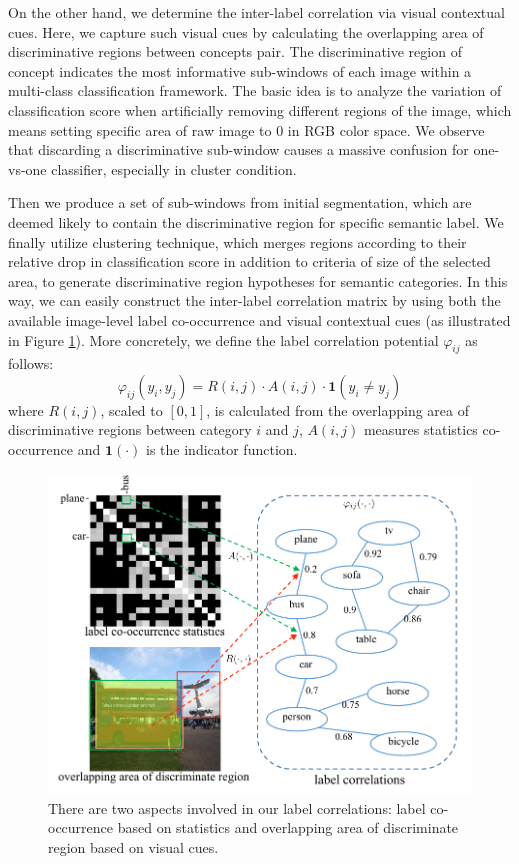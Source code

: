 On the other hand, we determine the inter-label correlation via visual contextual cues. Here, we capture such visual cues by calculating the overlapping area of discriminative regions between concepts pair. The discriminative region of concept indicates the most informative sub-windows of each image within a multi-class classification framework.
The basic idea is to analyze the variation of classification score when artificially removing different regions of the image, which means setting specific area of raw image to 0 in RGB color space. We observe that discarding a discriminative sub-window causes a massive confusion for one-vs-one classifier, especially in cluster condition.

Then we produce a set of sub-windows from initial segmentation, which are deemed likely to contain the discriminative region for specific semantic label. We finally utilize clustering technique, which merges regions according to their relative drop in classification score in addition to criteria of size of the selected area, to generate discriminative region hypotheses for semantic categories. In this way, we can easily construct the inter-label correlation matrix by using both the available image-level label co-occurrence and visual contextual cues (as illustrated in Figure \ref{fig:correlations}).
More concretely, we define the label correlation potential $\varphi_{ij}$ as follows:
\begin{equation}
    \varphi_{ij}(y_i,y_j) = R(i,j) \cdot A(i,j) \cdot \mathbf{1}(y_i \neq y_j)
\end{equation}
where $R(i,j)$, scaled to $[0,1]$, is calculated from the overlapping area of discriminative regions between category $i$ and $j$, $A(i,j)$ measures statistics co-occurrence and $\mathbf{1}(\cdot)$ is the indicator function.

\begin{figure}[t]
    \begin{center}
        \includegraphics[width=1\linewidth]{fig_correlations.pdf}
    \end{center}
    \caption{There are two aspects involved in our label correlations: label co-occurrence based on statistics and overlapping area of discriminate region based on visual cues.}
    \label{fig:correlations}
\end{figure}

